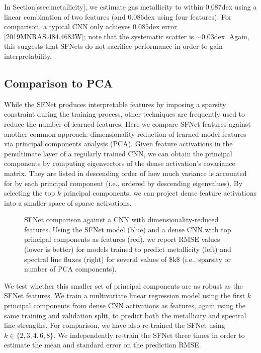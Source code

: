 \documentclass[11pt,a4paper]{article}
\begin{document}
In Section[ssec:metallicity], we estimate gas metallicity to within 0.087dex using a linear combination of two features (and 0.086dex using four features). For comparison, a typical CNN only achieves $0.085$dex error [2019MNRAS.484.4683W]; note that the systematic scatter is $\sim 0.03$dex. Again, this suggests that SFNets do not sacrifice performance in order to gain interpretability.

\subsection{Comparison to PCA}

While the SFNet produces interpretable features by imposing a sparsity constraint during the training process, other techniques are frequently used to reduce the number of learned features. Here we compare SFNet features against another common approach: dimensionality reduction of learned model features via principal components analysis (PCA). Given feature activations in the penultimate layer of a regularly trained CNN, we can obtain the principal components by computing eigenvectors of the dense activation's covariance matrix. They are listed in descending order of how much variance is accounted for by each principal component (i.e., ordered by descending eigenvalues). By selecting the top $k$ principal components, we can project dense feature activations into a smaller space of sparse activations.

\begin{figure}[h]
\caption{SFNet comparison against a CNN with dimensionality-reduced features. Using the SFNet model (blue) and a dense CNN with top principal components as features (red), we report RMSE values (lower is better) for models trained to predict metallicity (left) and spectral line fluxes (right) for several values of \$k\$ (i.e., sparsity or number of PCA components).}
\end{figure}

We test whether this smaller set of principal components are as robust as the SFNet features. We train a multivariate linear regression model using the first $k$ principal components from dense CNN activations as features, again using the same training and validation split, to predict both the metallicity and spectral line strengths. For comparison, we have also re-trained the SFNet using $k \in \{2, 3, 4, 6, 8\}$. We independently re-train the SFNet three times in order to estimate the mean and standard error on the prediction RMSE.
\end{document}
